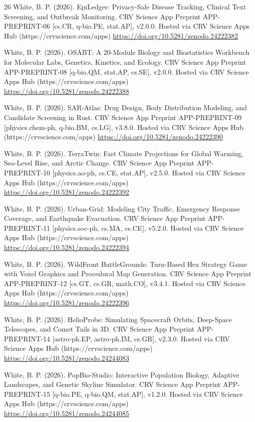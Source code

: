 \documentclass[10pt,letterpaper]{article}
\begin{document}
\begin{thebibliography}{26}
 White, B. P. (2026). EpiLedger: Privacy-Safe Disease Tracking, Clinical Text Screening, and Outbreak Monitoring. CRV Science App Preprint APP-PREPRINT-06 [cs.CR, q-bio.PE, stat.AP], v2.0.0. Hosted via CRV Science Apps Hub (https://crvscience.com/apps) \url{https://doi.org/10.5281/zenodo.24222382}

 White, B. P. (2026). OSABT: A 20-Module Biology and Biostatistics Workbench for Molecular Labs, Genetics, Kinetics, and Ecology. CRV Science App Preprint APP-PREPRINT-08 [q-bio.QM, stat.AP, cs.SE], v2.0.0. Hosted via CRV Science Apps Hub (https://crvscience.com/apps) \url{https://doi.org/10.5281/zenodo.24222388}

 White, B. P. (2026). SAR-Atlas: Drug Design, Body Distribution Modeling, and Candidate Screening in Rust. CRV Science App Preprint APP-PREPRINT-09 [physics.chem-ph, q-bio.BM, cs.LG], v3.8.0. Hosted via CRV Science Apps Hub (https://crvscience.com/apps) \url{https://doi.org/10.5281/zenodo.24222390}

 White, B. P. (2026). TerraTwin: Fast Climate Projections for Global Warming, Sea-Level Rise, and Arctic Change. CRV Science App Preprint APP-PREPRINT-10 [physics.ao-ph, cs.CE, stat.AP], v2.5.0. Hosted via CRV Science Apps Hub (https://crvscience.com/apps) \url{https://doi.org/10.5281/zenodo.24222392}

 White, B. P. (2026). Urban-Grid: Modeling City Traffic, Emergency Response Coverage, and Earthquake Evacuation. CRV Science App Preprint APP-PREPRINT-11 [physics.soc-ph, cs.MA, cs.CE], v5.2.0. Hosted via CRV Science Apps Hub (https://crvscience.com/apps) \url{https://doi.org/10.5281/zenodo.24222394}

 White, B. P. (2026). WildFront BattleGrounds: Turn-Based Hex Strategy Game with Voxel Graphics and Procedural Map Generation. CRV Science App Preprint APP-PREPRINT-12 [cs.GT, cs.GR, math.CO], v3.4.1. Hosted via CRV Science Apps Hub (https://crvscience.com/apps) \url{https://doi.org/10.5281/zenodo.24222396}

 White, B. P. (2026). HelioProbe: Simulating Spacecraft Orbits, Deep-Space Telescopes, and Comet Tails in 3D. CRV Science App Preprint APP-PREPRINT-14 [astro-ph.EP, astro-ph.IM, cs.GR], v2.3.0. Hosted via CRV Science Apps Hub (https://crvscience.com/apps) \url{https://doi.org/10.5281/zenodo.24244083}

 White, B. P. (2026). PopBio-Studio: Interactive Population Biology, Adaptive Landscapes, and Genetic Skyline Simulator. CRV Science App Preprint APP-PREPRINT-15 [q-bio.PE, q-bio.QM, stat.AP], v1.2.0. Hosted via CRV Science Apps Hub (https://crvscience.com/apps) \url{https://doi.org/10.5281/zenodo.24244085}


\end{thebibliography}
\end{document}
